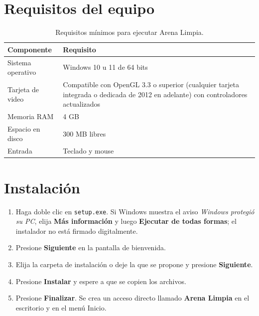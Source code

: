 \documentclass[12pt,letterpaper]{article}
\begin{document}
\section{Requisitos del equipo}
\begin{table}[H]
  \centering
  \caption{Requisitos mínimos para ejecutar Arena Limpia.}
  \label{tab:requisitos}
  \begin{tabularx}{\linewidth}{l X}
    \toprule
    \textbf{Componente} & \textbf{Requisito} \\
    \midrule
    Sistema operativo & Windows 10 u 11 de 64 bits \\
    Tarjeta de video  & Compatible con OpenGL 3.3 o superior (cualquier tarjeta
                        integrada o dedicada de 2012 en adelante) con controladores
                        actualizados \\
    Memoria RAM       & 4 GB \\
    Espacio en disco  & 300 MB libres \\
    Entrada           & Teclado y mouse \\
    \bottomrule
  \end{tabularx}
\end{table}

\section{Instalación}
\begin{enumerate}[leftmargin=*]
  \item Haga doble clic en \texttt{setup.exe}. Si Windows muestra el aviso
        \emph{Windows protegió su PC}, elija \textbf{Más información} y luego
        \textbf{Ejecutar de todas formas}; el instalador no está firmado digitalmente.
  \item Presione \textbf{Siguiente} en la pantalla de bienvenida.
  \item Elija la carpeta de instalación o deje la que se propone y presione
        \textbf{Siguiente}.
  \item Presione \textbf{Instalar} y espere a que se copien los archivos.
  \item Presione \textbf{Finalizar}. Se crea un acceso directo llamado
        \textbf{Arena Limpia} en el escritorio y en el menú Inicio.
\end{enumerate}
\end{document}
